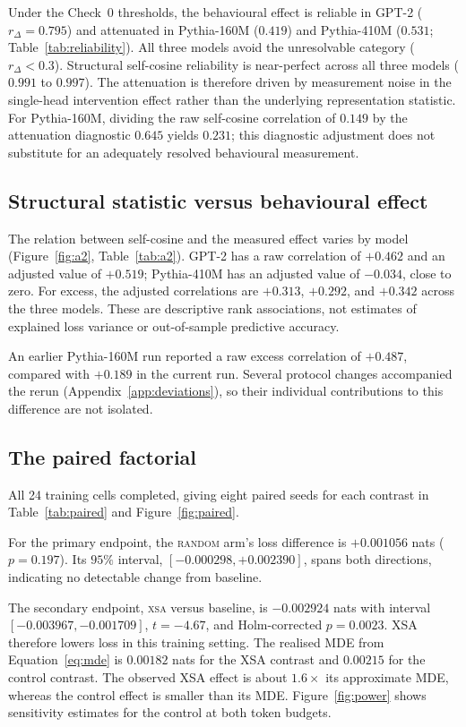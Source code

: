 \documentclass{article} %
\begin{document}
Under the Check~0 thresholds, the behavioural effect is reliable in GPT-2
($r_\Delta = 0.795$) and attenuated in Pythia-160M ($0.419$) and Pythia-410M
($0.531$; Table~\ref{tab:reliability}). All three models avoid the unresolvable
category ($r_\Delta < 0.3$). Structural self-cosine reliability is near-perfect
across all three models ($0.991$ to $0.997$). The attenuation is therefore driven
by measurement noise in the single-head intervention effect rather than the
underlying representation statistic. For Pythia-160M, dividing the raw self-cosine
correlation of $0.149$ by the attenuation diagnostic $0.645$ yields $0.231$;
this diagnostic adjustment does not substitute for an adequately resolved behavioural measurement.

\subsection{Structural statistic versus behavioural effect}
\label{sec:a2}

The relation between self-cosine and the measured effect varies by model
(Figure~\ref{fig:a2}, Table~\ref{tab:a2}). GPT-2 has a raw correlation of
$+0.462$ and an adjusted value of $+0.519$; Pythia-410M has an adjusted
value of $-0.034$, close to zero. For excess, the adjusted correlations are
$+0.313$, $+0.292$, and $+0.342$ across the three models. These are
descriptive rank associations, not estimates of explained loss variance or
out-of-sample predictive accuracy.

An earlier Pythia-160M run reported a raw excess correlation of $+0.487$,
compared with $+0.189$ in the current run. Several protocol changes
accompanied the rerun (Appendix~\ref{app:deviations}), so their individual
contributions to this difference are not isolated.

\subsection{The paired factorial}
\label{sec:paired}

All 24 training cells completed, giving eight paired seeds for each contrast
in Table~\ref{tab:paired} and Figure~\ref{fig:paired}.

For the primary endpoint, the \textsc{random} arm's loss difference is
$+0.001056$ nats ($p = 0.197$). Its $95\%$ interval,
$[-0.000298, +0.002390]$, spans both directions, indicating no detectable
change from baseline.

The secondary endpoint, \textsc{xsa} versus baseline, is $-0.002924$ nats with
interval $[-0.003967, -0.001709]$, $t = -4.67$, and Holm-corrected $p =
0.0023$. XSA therefore lowers loss in this training setting. The realised MDE from
Equation~\ref{eq:mde} is $0.00182$ nats for the XSA contrast and $0.00215$ for
the control contrast. The observed XSA effect is about $1.6\times$ its
approximate MDE, whereas the control effect is smaller than its MDE.
Figure~\ref{fig:power} shows sensitivity estimates for the control at both
token budgets.
\end{document}
